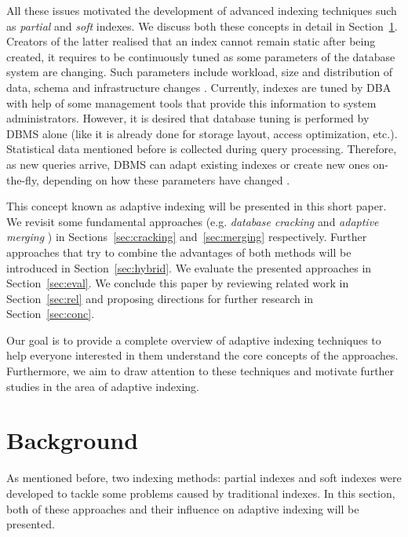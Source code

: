 \documentclass[10pt, conference, compsocconf]{IEEEtran}
\begin{document}
All these issues motivated the development of advanced indexing techniques such as \emph{partial} \cite{partial1} and \emph{soft} \cite{soft_indexes} indexes. We discuss both these concepts in detail in Section~\ref{sec:background}. Creators of the latter realised that an index cannot remain static after being created, it requires to be continuously tuned as some parameters of the database system are changing. Such parameters include workload, size and distribution of data, schema and infrastructure changes \cite{soft_indexes}. Currently, indexes are tuned by DBA with help of some management tools that provide this information to system administrators. However, it is desired that database tuning is performed by DBMS alone (like it is already done for storage layout, access optimization, etc.). Statistical data mentioned before is collected during query processing. Therefore, as new queries arrive, DBMS can adapt existing indexes or create new ones on-the-fly, depending on how these parameters have changed \cite{soft_indexes}.

This concept known as adaptive indexing will be presented in this short paper. We revisit some fundamental approaches (e.g. \emph{database cracking} \cite{cracking} and \emph{adaptive merging} \cite{merging}) in Sections~\ref{sec:cracking} and~\ref{sec:merging} respectively. Further approaches that try to combine the advantages of both methods will be introduced in Section~\ref{sec:hybrid}. We evaluate the presented approaches in Section~\ref{sec:eval}. We conclude this paper by reviewing related work in Section~\ref{sec:rel} and proposing directions for further research in Section~\ref{sec:conc}.

Our goal is to provide a complete overview of adaptive indexing techniques to help everyone interested in them understand the core concepts of the approaches. Furthermore, we aim to draw attention to these techniques and motivate further studies in the area of adaptive indexing.

\section{Background}
\label{sec:background}
As mentioned before, two indexing methods: partial indexes \cite{partial1} and soft indexes \cite{soft_indexes} were developed to tackle some problems caused by traditional indexes. In this section, both of these approaches and their influence on adaptive indexing will be presented.
\end{document}
